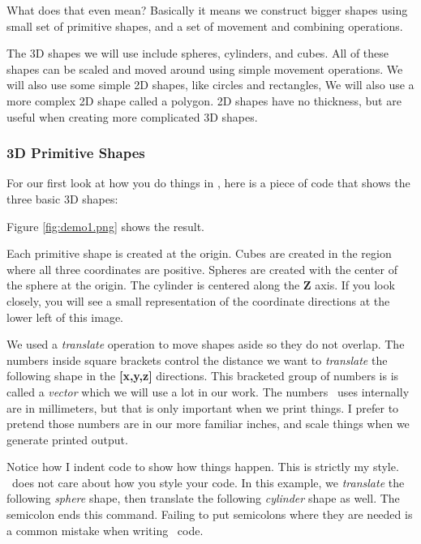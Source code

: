 What does that even mean?  Basically it means we construct bigger shapes using
small set of primitive shapes, and a set of movement and combining operations.

The 3D shapes we will use include spheres, cylinders, and cubes. All of these
shapes can be scaled and moved around using simple movement operations.  We
will also use some simple 2D shapes, like circles and rectangles, We will also
use a more complex 2D shape called a polygon.  2D shapes have no thickness, but
are useful when creating more complicated 3D shapes.

\subsubsection{3D Primitive Shapes}

For our first look at how you do things in \osc, here is a piece of code
that shows the three basic 3D shapes:


Figure \ref{fig:demo1.png} shows the result.


Each primitive shape is created at the origin. Cubes are created in the region
where all three coordinates are positive. Spheres are created with the center
of the sphere at the origin. The cylinder is centered along the {\bf Z} axis.
If you look closely, you will see a small representation of the coordinate
directions at the lower left of this image.

We used a {\it translate} operation to move shapes aside so they do not
overlap. The numbers inside square brackets control the distance we want to
{\it translate} the following shape in the {\bf [x,y,z]} directions. This
bracketed group of numbers is is called a {\it vector} which we will use a lot
in our work. The numbers \osc\ uses internally are in millimeters, but that is
only important when we print things. I prefer to pretend those numbers are in our
more familiar inches, and scale things when we generate printed output.

Notice how I indent code to show how things happen. This is strictly my style.
\osc\ does not care about how you style your code. In this example, we {\it
translate} the following {\it sphere} shape, then translate the following {\it
cylinder} shape as well. The semicolon ends this command.
Failing to put semicolons where they are needed is a common mistake when
writing \osc\ code.

